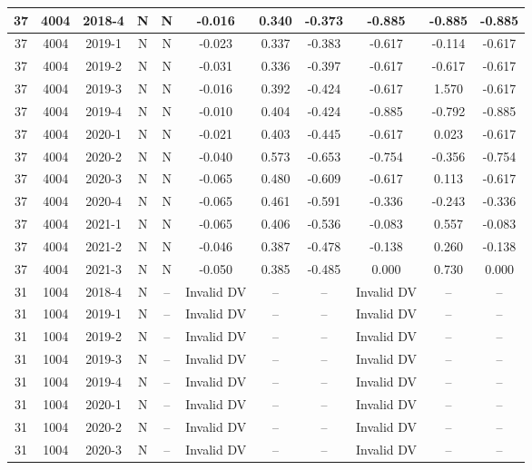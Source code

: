 \begin{landscape}
\begin{longtable}{@{}ccccc|ccc|ccc@{}}
\endfirsthead
%
\endhead
%
37 & 4004 & 2018-4 & N & N & -0.016 & 0.340 & -0.373 & -0.885 & -0.885 & -0.885 \\* \midrule
37 & 4004 & 2019-1 & N & N & -0.023 & 0.337 & -0.383 & -0.617 & -0.114 & -0.617 \\* \midrule
37 & 4004 & 2019-2 & N & N & -0.031 & 0.336 & -0.397 & -0.617 & -0.617 & -0.617 \\* \midrule
37 & 4004 & 2019-3 & N & N & -0.016 & 0.392 & -0.424 & -0.617 & 1.570 & -0.617 \\* \midrule
37 & 4004 & 2019-4 & N & N & -0.010 & 0.404 & -0.424 & -0.885 & -0.792 & -0.885 \\* \midrule
37 & 4004 & 2020-1 & N & N & -0.021 & 0.403 & -0.445 & -0.617 & 0.023 & -0.617 \\* \midrule
37 & 4004 & 2020-2 & N & N & -0.040 & 0.573 & -0.653 & -0.754 & -0.356 & -0.754 \\* \midrule
37 & 4004 & 2020-3 & N & N & -0.065 & 0.480 & -0.609 & -0.617 & 0.113 & -0.617 \\* \midrule
37 & 4004 & 2020-4 & N & N & -0.065 & 0.461 & -0.591 & -0.336 & -0.243 & -0.336 \\* \midrule
37 & 4004 & 2021-1 & N & N & -0.065 & 0.406 & -0.536 & -0.083 & 0.557 & -0.083 \\* \midrule
37 & 4004 & 2021-2 & N & N & -0.046 & 0.387 & -0.478 & -0.138 & 0.260 & -0.138 \\* \midrule
37 & 4004 & 2021-3 & N & N & -0.050 & 0.385 & -0.485 & 0.000 & 0.730 & 0.000 \\* \midrule
31 & 1004 & 2018-4 & N & -- & Invalid DV & -- & -- & Invalid DV & -- & -- \\* \midrule
31 & 1004 & 2019-1 & N & -- & Invalid DV & -- & -- & Invalid DV & -- & -- \\* \midrule
31 & 1004 & 2019-2 & N & -- & Invalid DV & -- & -- & Invalid DV & -- & -- \\* \midrule
31 & 1004 & 2019-3 & N & -- & Invalid DV & -- & -- & Invalid DV & -- & -- \\* \midrule
31 & 1004 & 2019-4 & N & -- & Invalid DV & -- & -- & Invalid DV & -- & -- \\* \midrule
31 & 1004 & 2020-1 & N & -- & Invalid DV & -- & -- & Invalid DV & -- & -- \\* \midrule
31 & 1004 & 2020-2 & N & -- & Invalid DV & -- & -- & Invalid DV & -- & -- \\* \midrule
31 & 1004 & 2020-3 & N & -- & Invalid DV & -- & -- & Invalid DV & -- & -- \\* \midrule

\end{longtable}
\end{landscape}
